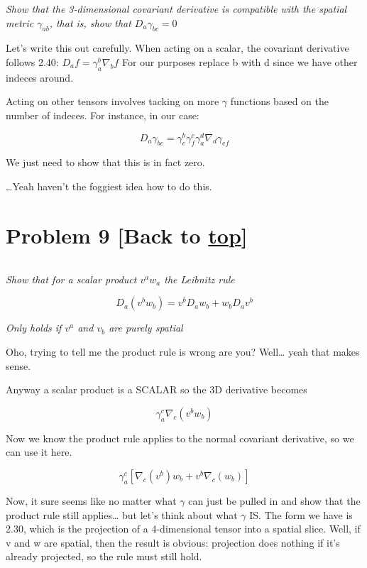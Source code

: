 \documentclass[landscape,letterpaper,10pt,english]{article}
\begin{document}
\[\label{P8}\]

\emph{Show that the 3-dimensional covariant derivative is compatible
with the spatial metric \(\gamma_{ab}\), that is, show that
\(D_a\gamma_{bc} = 0\)}

    Let's write this out carefully. When acting on a scalar, the covariant
derivative follows 2.40: \(D_af = \gamma_a^b \nabla_b f\) For our
purposes replace b with d since we have other indeces around.

Acting on other tensors involves tacking on more \(\gamma\) functions
based on the number of indeces. For instance, in our case:

\[ D_a\gamma_{bc} =  \gamma^b_e \gamma^c_f \gamma_a^d \nabla_d\gamma_{ef} \]

We just need to show that this is in fact zero.

    \ldots Yeah haven't the foggiest idea how to do this.

    \hypertarget{problem-9-back-to-top}{%
\section{\texorpdfstring{Problem 9 {[}Back to
\hyperref[toc]{top}{]}}{Problem 9 {[}Back to {]}}}\label{problem-9-back-to-top}}

\[\label{P9}\]

\emph{Show that for a scalar product \(v^aw_a\) the Leibnitz rule}

\[D_a(v^bw_b) = v^bD_aw_b + w_bD_av^b\]

\emph{Only holds if \(v^a\) and \(v_b\) are purely spatial}

Oho, trying to tell me the product rule is wrong are you? Well\ldots{}
yeah that makes sense.

    Anyway a scalar product is a SCALAR so the 3D derivative becomes

\[ \gamma^c_a \nabla_c (v^bw_b) \]

Now we know the product rule applies to the normal covariant derivative,
so we can use it here.

\[ \gamma^c_a \left[ \nabla_c (v^b) w_b + v^b \nabla_c (w_b) \right] \]

Now, it sure seems like no matter what \(\gamma\) can just be pulled in
and show that the product rule still applies\ldots{} but let's think
about what \(\gamma\) IS. The form we have is 2.30, which is the
projection of a 4-dimensional tensor into a spatial slice. Well, if v
and w are spatial, then the result is obvious: projection does nothing
if it's already projected, so the rule must still hold.
\end{document}
